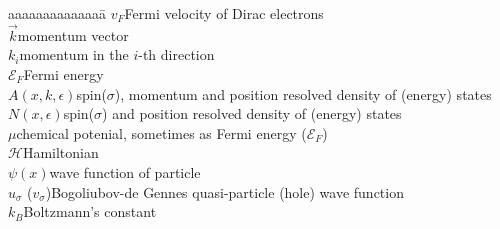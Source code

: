 \begin{tabbing}
  aaaaaaaaaaaaaa\=\kill
  $v_F$\>Fermi velocity of Dirac electrons\\
  $\vec{k}$\>momentum vector\\
  $k_i$\>momentum in the $i$-th direction\\
  $\mathcal{E}_F$\>Fermi energy\\
  $A(x,k,\epsilon)$\>spin($\sigma$), momentum and position resolved density of (energy) states\\
  $N(x,\epsilon)$\>spin($\sigma$) and position resolved density of (energy) states\\
  $\mu$\>chemical potenial, sometimes as Fermi energy ($\mathcal{E}_F$)\\
  $\mathcal{H}$\>Hamiltonian\\
  $\psi(x)$\>wave function of particle\\
  $u_\sigma$ ($v_\sigma$)\>Bogoliubov-de Gennes quasi-particle (hole) wave function\\
  $k_B$\>Boltzmann's constant\\
\end{tabbing}